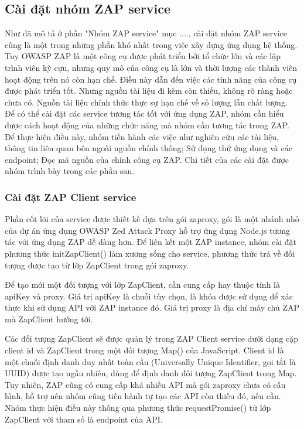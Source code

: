 \subsection{Cài đặt nhóm ZAP service} \label{subsec:CaiDatNhomZapService}

\tab Như đã mô tả ở phần "Nhóm ZAP service" mục ...., cài đặt nhóm ZAP service cũng là một trong những phần khó nhất trong việc xây dựng ứng dụng hệ thống.
Tuy OWASP ZAP là một công cụ được phát triển bởi tổ chức lớn và các lập trình viên kỳ cựu, nhưng quy mô của công cụ là lớn và thời lượng các thành viên hoạt động trên nó còn hạn chế.
Điều này dẫn đến việc các tính năng của công cụ được phát triển tốt.
Nhưng nguồn tài liệu đi kèm còn thiếu, không rõ ràng hoặc chưa có.
Nguồn tài liệu chính thức thực sự hạn chế về số lượng lẫn chất lượng.
Để có thể cài đặt các service tương tác tốt với ứng dụng ZAP,
nhóm cần hiểu được cách hoạt động của những chức năng mà nhóm cần tương tác trong ZAP.
Để thực hiện điều này, nhóm tiến hành các việc như nghiên cứu các tài liệu, thông tin liên quan bên ngoài nguồn chính thống;
Sử dụng thử ứng dụng và các endpoint; Đọc mã nguồn của chính công cụ ZAP.
Chi tiết của các cài đặt được nhóm trình bày trong các phần sau.

\subsubsection{Cài đặt ZAP Client service}

\tab Phần cốt lõi của service được thiết kế dựa trên gói zaproxy, gói là một nhánh nhỏ của dự án ứng dụng OWASP Zed Attack Proxy hỗ trợ ứng dụng Node.js tương tác với ứng dụng ZAP dễ dàng hơn. Để liên kết một ZAP instance, nhóm cài đặt phương thức initZapClient() làm xương sống cho service, phương thức trả về đối tượng được tạo từ lớp ZapClient trong gói zaproxy.

Để tạo mới một đối tượng với lớp ZapClient, cần cung cấp hay thuộc tính là apiKey và proxy. Giá trị apiKey là chuỗi tùy chọn, là khóa được sử dụng để xác thực khi sử dụng API với ZAP instance đó. Giá trị proxy là địa chỉ máy chủ ZAP mà ZapClient hướng tới.

Các đối tượng ZapClient sẽ được quản lý trong ZAP Client service dưới dạng cặp client id và ZapClient trong một đối tượng Map() của JavaScript. Client id là một chuỗi định danh duy nhất toàn cầu (Universally Unique Identifier, gọi tắt là UUID) được tạo ngẫu nhiên, dùng để định danh đối tượng ZapClient trong Map. Tuy nhiên, ZAP cũng có cung cấp khá nhiều API mà gói zaproxy chưa có cấu hình, hỗ trợ nên nhóm cũng tiến hành tự tạo các API còn thiếu đó, nếu cần. Nhóm thực hiện điều này thông qua phương thức requestPromise() từ lớp ZapClient với tham số là endpoint của API.

